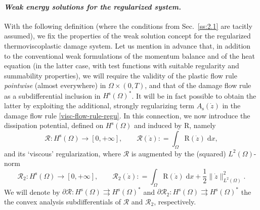 \documentclass[a4paper,10pt,reqno]{amsart}
\numberwithin{equation}{section}
\numberwithin{equation}{section}
\def\dd{\;\!\mathrm{d}} %
\newcommand{\did}[1]{\mathrm{R}(#1)}
\newcommand{\Did}[1]{\mathcal{R}(#1)}
\newcommand{\Didv}[1]{\mathcal{R}_{2}(#1)}
\newcommand{\didname}{\mathrm{R}}
\newcommand{\Didname}{\mathcal{R}}
\newcommand{\Didvname}{\mathcal{R}_2}
\newcommand{\spz}{H^{\mathrm{s}}(\Omega)}
\newcommand{\As}{A_{\mathrm{s}}}
\newcommand{\EEE}{\color{black}}
\newcommand{\MMM}{\color{black}}%
\begin{document}
\paragraph{\emph{Weak energy solutions for the regularized system.}}
     With the following definition (where the conditions from Sec.\ \ref{ss:2.1} are tacitly assumed), 
     we fix the properties of the weak solution concept for the regularized thermoviscoplastic damage system.
     Let us mention in advance that, in addition to the conventional weak formulations of the momentum balance and of the heat equation
     (in the latter case, with test functions with suitable regularity and summability properties), we will require the validity of the plastic flow rule 
     \emph{pointwise} (almost everywhere) in $\Omega \times (0,T)$, and that of the damage flow rule  as a subdifferential inclusion in $H^{\mathrm{s}}(\Omega)^*$.  
     \MMM It will be in fact possible to obtain the latter by exploiting the additional, strongly  regularizing  term $\As(\dot z)$ in the damage flow rule
     \eqref{visc-flow-rule-regu}. \EEE 
     In this connection, we now
     introduce the  dissipation potential, defined on
 $\spz$ and  induced by $\didname$, namely
\begin{equation}
\label{abstract-dissip-potential}
\Didname: \spz \to [0,+\infty], \qquad \Did{\dot z}: = \int_\Omega \did{\dot z} \dd x,
\end{equation}
and its `viscous' regularization, where $\Didname$ is augmented by the (squared) $L^2(\Omega)$-norm
\begin{equation}
\label{didvname}
\Didvname: \spz \to [0,+\infty], \qquad \Didv{\dot z}: = \int_\Omega \did{\dot z} \dd x + \frac12 \| \dot{z}\|_{L^2(\Omega)}^2.
\end{equation}
We will denote by  $\partial \Didname: \spz \rightrightarrows \spz^*$ and 
 $\partial \Didvname: \spz \rightrightarrows \spz^*$ the 
 the convex analysis  subdifferentials  of $\Didname$ and $\Didvname$, respectively.
\end{document}
